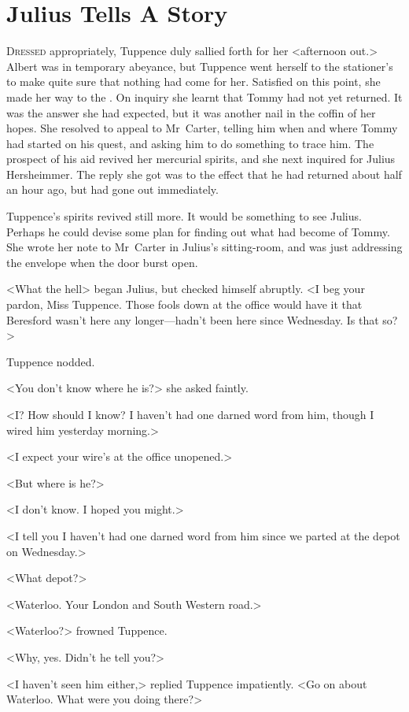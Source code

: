 \chapter{Julius Tells A Story} 

 \lettrine{D}{ressed} appropriately, Tuppence duly sallied forth for her <afternoon out.> Albert was in temporary abeyance, but Tuppence went herself to the stationer's to make quite sure that nothing had come for her. Satisfied on this point, she made her way to the . On inquiry she learnt that Tommy had not yet returned. It was the answer she had expected, but it was another nail in the coffin of her hopes. She resolved to appeal to Mr~Carter, telling him when and where Tommy had started on his quest, and asking him to do something to trace him. The prospect of his aid revived her mercurial spirits, and she next inquired for Julius Hersheimmer. The reply she got was to the effect that he had returned about half an hour ago, but had gone out immediately.

Tuppence's spirits revived still more. It would be something to see Julius. Perhaps he could devise some plan for finding out what had become of Tommy. She wrote her note to Mr~Carter in Julius's sitting-room, and was just addressing the envelope when the door burst open.

<What the hell\longdash> began Julius, but checked himself abruptly. <I beg your pardon, Miss Tuppence. Those fools down at the office would have it that Beresford wasn't here any longer—hadn't been here since Wednesday. Is that so?>

Tuppence nodded.

<You don't know where he is?> she asked faintly.

<I? How should I know? I haven't had one darned word from him, though I wired him yesterday morning.>

<I expect your wire's at the office unopened.>

<But where is he?>

<I don't know. I hoped you might.>

<I tell you I haven't had one darned word from him since we parted at the depot on Wednesday.>

<What depot?>

<Waterloo. Your London and South Western road.>

<Waterloo?> frowned Tuppence.

<Why, yes. Didn't he tell you?>

<I haven't seen him either,> replied Tuppence impatiently. <Go on about Waterloo. What were you doing there?>

